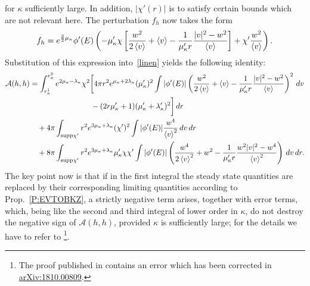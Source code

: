 \documentclass[11pt]{article}
\begin{document}
for $\kappa$ sufficiently large. In addition, $|\chi'(r)|$
is to satisfy certain bounds which are not relevant here.
The perturbation $f_{h}$ now takes the form
\[
f_{h} = e^{\frac32\mu_\kappa} \phi'(E)
\left(-\mu_\kappa' \chi\left[\frac{w^2}{2\left\langle v\right\rangle}
  + \left\langle v\right\rangle -\frac{1}{\mu_\kappa'r}\frac{|v|^2-w^2}{\left\langle v\right\rangle}\right]+
\chi'\frac{w^2}{\left\langle v\right\rangle}\right).
\]
Substitution of this expression into~\eqref{linen}
yields the following identity:
\begin{align*}
  \mathcal{A}(h,h) 
  &= \int_{r_\kappa^1}^{r_\kappa^2} e^{2\mu_\kappa-\lambda_\kappa} \chi^2
  \biggl[ 4\pi r^2 e^{\mu_\kappa+2\lambda_\kappa}(\mu_\kappa')^2
  \int |\phi'(E)|
  \left(\frac{w^2}{2\left\langle v\right\rangle} + \left\langle v\right\rangle
  -\frac{1}{\mu_\kappa'r}\frac{|v|^2-w^2}{\left\langle v\right\rangle}\right)^2\,dv \\
  &
  \qquad \qquad \qquad \qquad  - (2r\mu_\kappa'+1)
  (\mu_\kappa'+\lambda_\kappa')^2\biggr]\,dr \\
  &
  \quad
  + 4\pi \int_{\text{supp}\chi'} r^2 e^{3\mu_\kappa+\lambda_\kappa}(\chi')^2
  \int |\phi'(E)|\frac{w^4}{\left\langle v\right\rangle^2}\,dv\,dr \\
  &
  \quad
  + 8\pi \int_{\text{supp}\chi'}
  r^2 e^{3\mu_\kappa+\lambda_\kappa} \mu_\kappa' \chi \chi'
  \int |\phi'(E)| \left(\frac{w^4}{2\left\langle v\right\rangle^2}+w^2
  -\frac{1}{\mu_\kappa'r}\frac{w^2|v|^2-w^4}{\left\langle v\right\rangle^2}\right)\,dv\,dr.
\end{align*}
The key point now is that if in the first integral
the steady state quantities are replaced by their corresponding
limiting quantities according to Prop.~\ref{P:EVTOBKZ},
a strictly negative term arises, together with error
terms, which, being like the second and third integral of
lower order in $\kappa$, do not destroy the negative
sign of $\mathcal{A}(h,h)$, provided $\kappa$ is sufficiently
large; for the details we have to refer to \cite[Theorem~4.3]{HaLinRe}
\footnote{The proof published in \cite{HaLinRe}
          contains an error which has been corrected in
          \href{https://arxiv.org/abs/1810.00809}{arXiv:1810.00809}.}.
%
%
\end{document}
